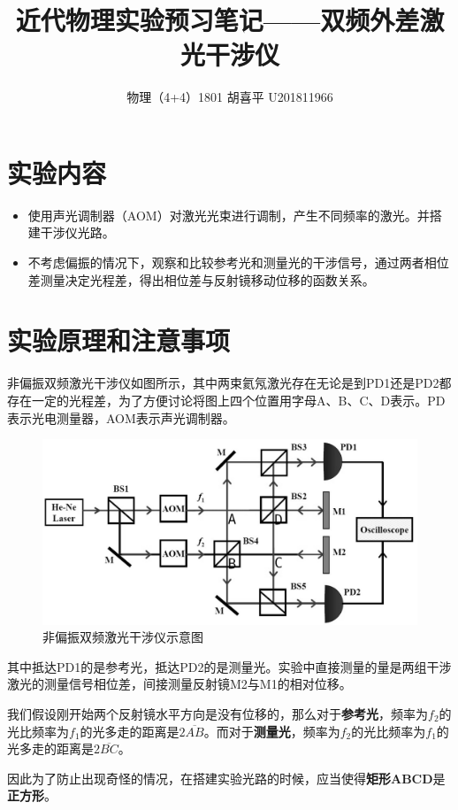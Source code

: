 \documentclass{article}
\author{物理（4+4）1801 \quad  胡喜平 \quad U201811966}
\affil{个人网站 https://hxp.plus/ \quad 电子邮件 hxp201406@gmail.com}
\title{近代物理实验预习笔记——双频外差激光干涉仪}
\begin{document}
\maketitle\thispagestyle{fancy}

\section{实验内容}

\begin{itemize}
\item 使用声光调制器（AOM）对激光光束进行调制，产生不同频率的激光。并搭建干涉仪光路。
\item 不考虑偏振的情况下，观察和比较参考光和测量光的干涉信号，通过两者相位差测量决定光程差，得出相位差与反射镜移动位移的函数关系。
\end{itemize}

\section{实验原理和注意事项}

非偏振双频激光干涉仪如图所示，其中两束氦氖激光存在无论是到PD1还是PD2都存在一定的光程差，为了方便讨论将图上四个位置用字母A、B、C、D表示。PD表示光电测量器，AOM表示声光调制器。

\begin{figure}[H]
  \centering
  \includegraphics[width=0.9\linewidth]{figures/非偏振双频激光干涉仪}
  \caption{非偏振双频激光干涉仪示意图}
\end{figure}

其中抵达PD1的是参考光，抵达PD2的是测量光。实验中直接测量的量是两组干涉激光的测量信号相位差，间接测量反射镜M2与M1的相对位移。

我们假设刚开始两个反射镜水平方向是没有位移的，那么对于\textbf{参考光}，频率为$f_2$的光比频率为$f_1$的光多走的距离是$2 \overline{AB}$。而对于\textbf{测量光}，频率为$f_2$的光比频率为$f_1$的光多走的距离是$2 \overline{BC}$。

因此为了防止出现奇怪的情况，在搭建实验光路的时候，应当使得\textbf{矩形ABCD}是\textbf{正方形}。
\end{document}
